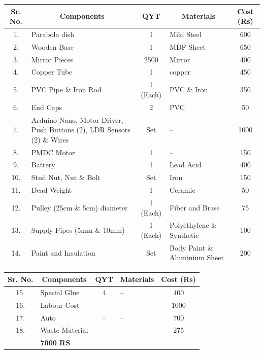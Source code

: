\documentclass[12pt,a4paper]{article}
\begin{document}
\begin{center}
\renewcommand{\arraystretch}{1.22}
\begin{tabular}{|c|p{45mm}|c|p{35mm}|c|}
\hline
\rowcolor{gray!20}
\textbf{Sr. No.} & \multicolumn{1}{c|}{\textbf{Components}} & \textbf{QYT} & \multicolumn{1}{c|}{\textbf{Materials}} & \textbf{Cost (Rs)} \\
\hline
1. & Parabola dish & 1 & Mild Steel & 600 \\
\hline
2. & Wooden Base & 1 & MDF Sheet & 650 \\
\hline
3. & Mirror Pieces & 2500 & Mirror & 400 \\
\hline
4. & Copper Tube & 1 & copper & 450 \\
\hline
5. & PVC Pipe \& Iron Rod & 1 (Each) & PVC \& Iron & 350 \\
\hline
6. & End Caps & 2 & PVC & 50 \\
\hline
7. & Arduino Nano, Motor Driver, Push Buttons (2), LDR Sensors (2) \& Wires & Set & -- & 1000 \\
\hline
8. & PMDC Motor & 1 & -- & 150 \\
\hline
9. & Battery & 1 & Lead Acid & 400 \\
\hline
10. & Stud Nut, Nut \& Bolt & Set & Iron & 150 \\
\hline
11. & Dead Weight & 1 & Ceramic & 50 \\
\hline
12. & Pulley (25cm \& 5cm) diameter & 1 (Each) & Fiber and Brass & 75 \\
\hline
13. & Supply Pipes (5mm \& 10mm) & 1 (Each) & Polyethylene \& Synthetic & 100 \\
\hline
14. & Paint and Insulation & Set & Body Paint \& Aluminium Sheet & 200 \\
\hline
\end{tabular}
\end{center}
\clearpage




\vspace*{10mm}
\begin{center}
\renewcommand{\arraystretch}{1.35}
\begin{tabular}{|c|p{45mm}|c|p{35mm}|c|}
\hline
\rowcolor{gray!20}
\textbf{Sr. No.} & \multicolumn{1}{c|}{\textbf{Components}} & \textbf{QYT} & \multicolumn{1}{c|}{\textbf{Materials}} & \textbf{Cost (Rs)} \\
\hline
15. & Special Glue & 4 & -- & 400 \\
\hline
16. & Labour Cost & -- & -- & 1000 \\
\hline
17. & Auto & -- & -- & 700 \\
\hline
18. & Waste Material & -- & -- & 275 \\
\hline
\rowcolor{gray!15}
\multicolumn{4}{|r|}{\textbf{TOTAL}} & \textbf{7000 RS} \\
\hline
\end{tabular}
\end{center}
\clearpage
\end{document}
